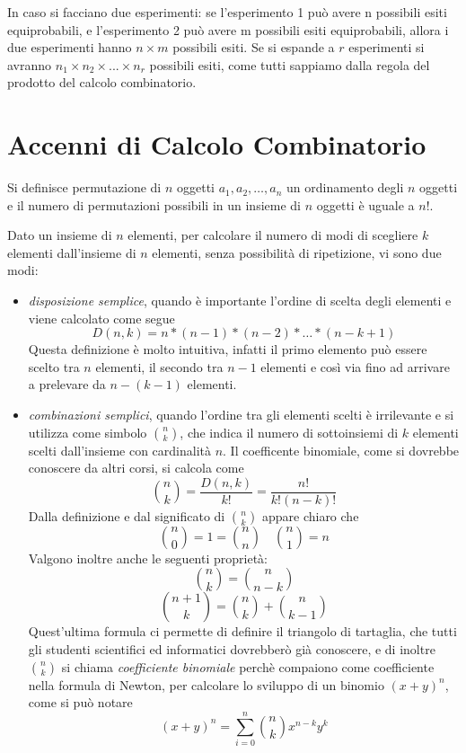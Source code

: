 \documentclass[a4paper,12pt, oneside]{book}
\begin{document}
In caso si facciano due esperimenti: se l'esperimento 1 può avere n possibili esiti equiprobabili,
e l'esperimento 2 può avere m possibili esiti equiprobabili, allora i due esperimenti hanno $n\times m$ possibili esiti.\newline
Se si espande a $r$ esperimenti si avranno $n_1\times n_2\times ...\times n_r$ possibili esiti, come 
tutti sappiamo dalla regola del prodotto del calcolo combinatorio.

\section{Accenni di Calcolo Combinatorio}
\begin{definizione}
    Si definisce permutazione di $n$ oggetti $a_1, a_2, \dots, a_n$ un ordinamento degli $n$ oggetti
    e il numero di permutazioni possibili in un insieme di $n$ oggetti è uguale a $n!$.
\end{definizione}
Dato un insieme di $n$ elementi, per calcolare il numero di modi di scegliere $k$ elementi dall'insieme
di $n$ elementi, senza possibilità di ripetizione, vi sono due modi:
\begin{itemize}
    \item \emph{disposizione semplice}, quando è importante l'ordine di scelta degli elementi e viene
        calcolato come segue
        \[ D(n, k) = n * (n - 1) * (n - 2) * \dots * (n - k + 1) \]
        Questa definizione è molto intuitiva, infatti il primo elemento può essere scelto tra $n$ elementi,
        il secondo tra $n-1$ elementi e così via fino ad arrivare a prelevare da $n - (k-1)$ elementi.
    \item \emph{combinazioni semplici}, quando l'ordine tra gli elementi scelti è irrilevante e si utilizza
          come simbolo $\binom{n}{k}$, che indica il numero di sottoinsiemi di $k$ elementi scelti
          dall'insieme con cardinalità $n$.\newline
          Il coefficente binomiale, come si dovrebbe conoscere da altri corsi, si calcola come
          \[ \binom{n}{k} = \frac{D(n, k)}{k!} = \frac{n!}{k! (n-k)!} \]
          Dalla definizione e dal significato di $\binom{n}{k}$ appare chiaro che 
          \[ \binom{n}{0} = 1 = \binom{n}{n} \quad \binom{n}{1} = n \]
          Valgono inoltre anche le seguenti proprietà:
          \[ \binom{n}{k} = \binom{n}{n-k} \]
          \[ \binom{n + 1}{k} = \binom{n}{k} + \binom{n}{k - 1}\]
          Quest'ultima formula ci permette di definire il triangolo di tartaglia, che tutti gli studenti
          scientifici ed informatici dovrebberò già conoscere, e di inoltre $\binom{n}{k}$ si chiama 
          \emph{coefficiente binomiale} perchè compaiono come coefficiente nella formula di Newton, per 
          calcolare lo sviluppo di un binomio $(x + y)^n$, come si può notare
          \[ (x + y)^n = \sum _{i = 0} ^ n \binom{n}{k} x^{n-k} y^k\]
\end{itemize}
\end{document}
